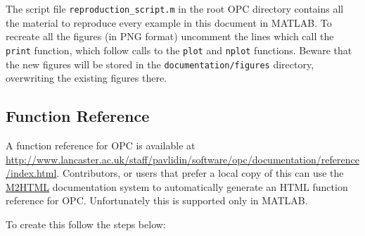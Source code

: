 \documentclass{book}
\begin{document}
The script file {\tt reproduction\_script.m} in the root OPC directory
contains all the material to reproduce every example in this
document in MATLAB. To recreate all the figures (in PNG format) uncomment the
lines which call the {\tt print} function, which follow 
calls to the 
{\tt plot} and {\tt nplot} functions. Beware that the new figures
will be stored in the {\tt documentation/figures} directory,
overwriting the existing figures there.


\subsection{Function Reference}\label{sec:htmlref}

A function reference for OPC is available at
%
\url{http://www.lancaster.ac.uk/staff/pavlidin/software/opc/documentation/reference/index.html}.
%
Contributors, or users that prefer a local copy of this can use the 
%
\href{https://www.artefact.tk/software/matlab/m2html/}{M2HTML}
%
documentation system to automatically generate an HTML function reference for
OPC. Unfortunately this is supported only in MATLAB.

To create this follow the steps below:
\end{document}
